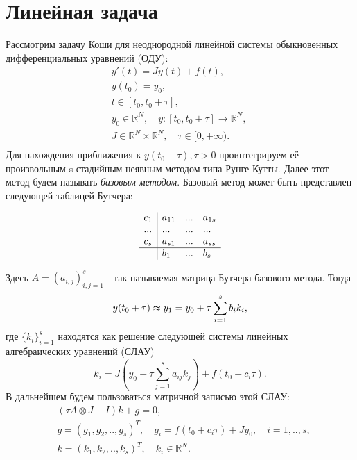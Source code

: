 \documentclass[a4paper,14pt]{extreport}
\begin{document}
  \section{Линейная задача}
  \label{s:linear_problem}
Рассмотрим задачу Коши для неоднородной линейной системы обыкновенных дифференциальных уравнений (ОДУ):
	\begin{equation}
	\begin{aligned}
	\label{main_problem}
	&y'(t)=Jy(t)+f(t),\\
	&y(t_0)=y_0,\\
	&t \in [t_0, t_0+\tau],\quad \\
	&y_0\in \mathbb{R}^N,\quad
	y:[t_0,t_0+\tau] \to \mathbb{R}^N,\quad\\
	&J \in \mathbb{R}^N \times \mathbb{R}^N, \quad
	\tau \in [0, +\infty).\\
	\end{aligned}
	\end{equation} 
Для нахождения приближения к $y(t_0 + \tau), \tau > 0$ проинтегрируем её произвольным s-стадийным неявным методом типа Рунге-Кутты. Далее этот метод будем называть \textit{базовым методом}. Базовый метод может быть представлен следующей таблицей Бутчера:
	\begin{center}
	\begin{equation}
	\label{base_method}
	\begin{array}{l|lll}
	c_1& a_{11}& ...& a_{1s}\\
	...& ...& ...& ...\\
	c_s& a_{s1}& ...& a_{ss}\\
	\hline
	& b_1& ...& b_s\\
	\end{array}
	\end{equation}
	\end{center}
Здесь $A=(a_{i,j})_{i,j=1}^s$ - так называемая матрица Бутчера
базового метода. Тогда
	$$ y(t_0+\tau)\thickapprox y_1=y_0+\tau\sum_{i=1}^sb_ik_i,$$
где $\{k_i\}_{i=1}^s$ находятся как решение следующей системы линейных алгебраических уравнений (СЛАУ)
	$$k_i = J(y_0+\tau\sum_{j=1}^sa_{ij}k_j)+f(t_0+c_i\tau).$$
В дальнейшем будем пользоваться матричной записью этой СЛАУ:
	\begin{equation}\label{system_for_solving}
	\begin{aligned}
	&(\tau A\otimes J-I)k+g=0,\\
	&g=(g_1,g_2,..,g_s)^T, \quad g_i=f(t_0+c_i \tau)+Jy_0, \quad i=1,..,s,\\
	&k=(k_1,k_2,..,k_s)^T, \quad k_i \in \mathbb{R}^N.\\
	\end{aligned}
	\end{equation}
\end{document}
